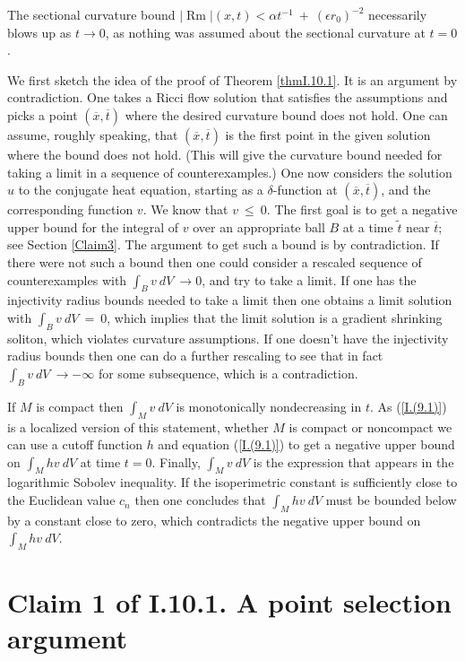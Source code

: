 \documentclass[12pt]{amsart}
\newcommand{\Rm}{\operatorname{Rm}}
\numberwithin{equation}{section}
\theoremstyle{plain}
\theoremstyle{definition}
\theoremstyle{remark}
\begin{document}
The sectional curvature bound $|\Rm|(x,t) <
\alpha t^{-1} \: + \: (\epsilon r_0)^{-2}$ necessarily blows up
as $t \rightarrow 0$, as nothing was assumed about
the sectional curvature at $t = 0$.

We first sketch the idea of the proof of Theorem
\ref{thmI.10.1}.
It is an argument by contradiction.
One takes a Ricci flow solution that satisfies the assumptions and
picks a point $(\overline{x}, \overline{t})$ where the
desired curvature bound does not hold.  One can assume, roughly speaking,
that $(\overline{x}, \overline{t})$ is the first point in the given
solution where the bound does not hold. (This will give the curvature
bound needed for taking
a limit in a sequence of counterexamples.)  One now
considers the solution $u$ to the conjugate heat equation, starting as
a $\delta$-function at $(\overline{x}, \overline{t})$, and the 
corresponding function $v$. We know that $v \: \le \: 0$. The first
goal is to get a negative upper bound for the integral of $v$ over
an appropriate ball $B$ at
a time $\widetilde{t}$ near $\overline{t}$; see Section \ref{Claim3}. 
The argument to get such
a bound is by contradiction.  If there were not such a bound then one
could consider a rescaled sequence of counterexamples with
$\int_B v \: dV \: \rightarrow 0$, and try to take a 
limit. If one has the injectivity radius bounds needed to take a limit
then one obtains a limit solution with
$\int_B v \: dV \: = \: 0$, which implies that the limit solution is a
gradient shrinking soliton, which violates curvature assumptions. If one
doesn't have the injectivity radius bounds
then one can do a further rescaling to see that
in fact $\int_B v \: dV \: \rightarrow -\infty$ for some subsequence, 
which is a contradiction.

If $M$ is compact then
$\int_M v \: dV$ is monotonically nondecreasing in $t$.
As (\ref{I.(9.1)}) is a localized version of this statement,
whether $M$ is compact or noncompact
we can use a cutoff function $h$ and equation (\ref{I.(9.1)})
to get a negative upper bound on $\int_M h v \: dV$ at time $t = 0$.
Finally, $\int_M v \: dV$ is the expression that
appears in the
logarithmic Sobolev inequality. If the isoperimetric constant
is sufficiently close to the Euclidean value $c_n$ then one concludes
that $\int_M hv \: dV$ must be bounded below by a constant close to zero,
which contradicts the negative upper bound on $\int_M hv \: dV$.

\section{Claim 1 of I.10.1. A 
point selection 
argument}
\end{document}

